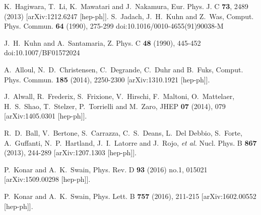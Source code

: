 \documentclass[pdftex,twocolumn,epjc3]{svjour3}          %
\begin{document}
\begin{thebibliography}{9}
K.~Hagiwara, T.~Li, K.~Mawatari and J.~Nakamura,
Eur. Phys. J. C \textbf{73}, 2489 (2013)
[arXiv:1212.6247 [hep-ph]].
S.~Jadach, J.~H.~Kuhn and Z.~Was,
Comput. Phys. Commun. \textbf{64} (1990), 275-299
doi:10.1016/0010-4655(91)90038-M


J.~H.~Kuhn and A.~Santamaria,
Z. Phys. C \textbf{48} (1990), 445-452
doi:10.1007/BF01572024



A.~Alloul, N.~D.~Christensen, C.~Degrande, C.~Duhr and B.~Fuks,
Comput. Phys. Commun. \textbf{185} (2014), 2250-2300
[arXiv:1310.1921 [hep-ph]].


J.~Alwall, R.~Frederix, S.~Frixione, V.~Hirschi, F.~Maltoni, O.~Mattelaer, H.~S.~Shao, T.~Stelzer, P.~Torrielli and M.~Zaro,
JHEP \textbf{07} (2014), 079
[arXiv:1405.0301 [hep-ph]].


R.~D.~Ball, V.~Bertone, S.~Carrazza, C.~S.~Deans, L.~Del Debbio, S.~Forte, A.~Guffanti, N.~P.~Hartland, J.~I.~Latorre and J.~Rojo, \textit{et al.}
Nucl. Phys. B \textbf{867} (2013), 244-289
[arXiv:1207.1303 [hep-ph]].



P.~Konar and A.~K.~Swain,
Phys. Rev. D \textbf{93} (2016) no.1, 015021
[arXiv:1509.00298 [hep-ph]].

P.~Konar and A.~K.~Swain,
Phys. Lett. B \textbf{757} (2016), 211-215
[arXiv:1602.00552 [hep-ph]].



\end{thebibliography}
\end{document}
